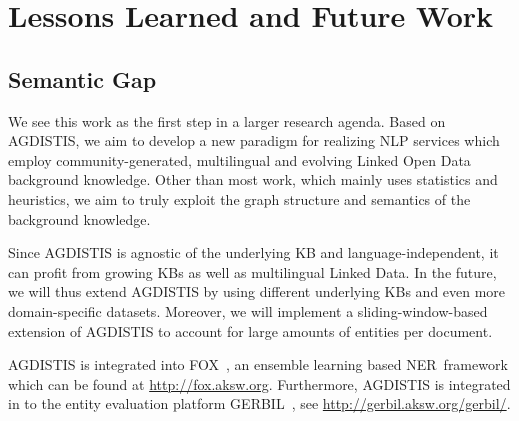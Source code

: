 \section*{Lessons Learned and Future Work}
\subsection{Semantic Gap}
We see this work as the first step in a larger research agenda.
Based on AGDISTIS, we aim to develop a new paradigm for realizing \ac{NLP} services which employ community-generated, multilingual and evolving Linked Open Data background knowledge.
Other than most work, which mainly uses statistics and heuristics, we aim to truly exploit the graph structure and semantics of the background knowledge.

Since AGDISTIS is agnostic of the underlying \ac{KB} and language-independent, it can profit from growing \ac{KB}s as well as multilingual Linked Data.
In the future, we will thus extend AGDISTIS by using different underlying \ac{KB}s and even more domain-specific datasets.
Moreover, we will implement a sliding-window-based extension of AGDISTIS to account for large amounts of entities per document.
%



AGDISTIS is integrated into FOX~\cite{FOX}, an ensemble learning based \ac{NER}~framework which can be found at \url{http://fox.aksw.org}. 
Furthermore, AGDISTIS is integrated in to the entity evaluation platform GERBIL~\cite{GERBIL}, see \url{http://gerbil.aksw.org/gerbil/}.



